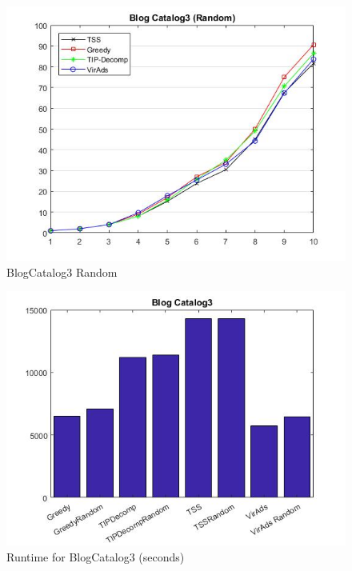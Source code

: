 \begin{figure}
	\centering	
	\includegraphics[scale=0.5]{images/bc3resultrandom.jpg}
	\caption{BlogCatalog3 Random}
	\end{figure}
\begin{figure}
	\centering	
	\includegraphics[scale=0.5]{images/bc3time.jpg}
	\caption{Runtime for BlogCatalog3 (seconds)}
\end{figure}

